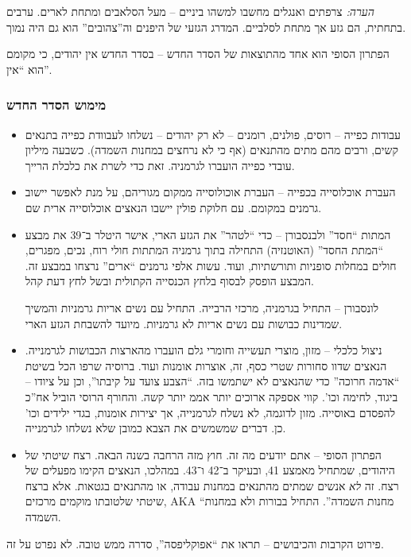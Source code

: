 \documentclass[]{article}
\theoremstyle{definition}
\begin{document}
    \textit{הערה: }צרפתים ואנגלים מחשבו למשהו ביניים – מעל הסלאבים ומתחת לארים. ערבים בתחתית, הם גזע אך מתחת לסלביים. המדרג הגזעי של היפנים וה''צהובים'' הוא גם היה נמוך. 
    
    הפתרון הסופי הוא אחד מהתוצאות של הסדר החדש – בסדר החדש אין יהודים, כי מקומם הוא ``אין''. 
    
    \subsubsection{מימוש הסדר החדש}
    \begin{itemize}
        \item עבודות כפייה – רוסים, פולנים, רומנים – לא רק יהודים – נשלחו לעבוודת כפייה בתנאים קשים, ורבים מהם מתים מהתנאים (אף כי לא נרחצים במחנות השמדה). כשבעה מיליון עובדי כפייה הועברו לגרמניה. זאת כדי לשרת את כלכלת הרייך. 
        \item העברת אוכלוסייה בכפייה – העברת אוכולוסייה ממקום מגוריהם, על מנת לאפשר יישוב גרמנים במקומם. עם חלוקת פולין יישבו הנאצים אוכלוסייה ארית שם. 
        \item המתות ``חסד'' ולבנסבורן – כדי ``לטהר'' את הגזע הארי, אישר היטלר ב־39 את מבצע ``המתת החסד'' (האוטנזיה) התחילה בתוך גרמניה המתתות חולי רוח, נכים, מפגרים, חולים במחלות סופניות ותורשתיות, ועוד. עשות אלפי גרמנים ``ארים'' נרצחו במבצע זה. המבצע הופסק לבסוף בלחץ הכנסייה הקתולית ובשל לחץ דעת קהל. 
        
        לונסבורן – התחיל בגרמניה, מרכזי הרבייה. התחיל עם נשים אריות גרמניות והמשיך שמדינות כבושות עם נשים אריות לא גרמניות. מיועד להשבחת הגזע הארי. 
        \item ניצול כלכלי – מזון, מוצרי תעשייה וחומרי גלם הועברו מהארצות הכבושות לגרמנייה. הנאצים שדוו סחורות שטרי כסף, זה, אוצרות אומנות ועוד. ברוסיה שרפו הכל בשיטת ``אדמה חרוכה'' כדי שהנאצים לא ישתמשו בזה. ``הצבע צועד על קיבתו'', וכן על ציודו – ביגוד, לחימה וכו'. קווי אספקה ארוכים יותר אממ יותר קשה. והחורף הרוסי הוביל אח''כ להפסדם באוסייה. מזון לדוגמה, לא נשלח לגרמנייה, אך יצירות אומנות, בגדי ילידים וכו' כן. דברים שמשמשים את הצבא כמובן שלא נשלחו לגרמנייה. 
        \item הפתרון הסופי – אתם יודעים מה זה. חוץ מזה הרחבה בשנה הבאה. רצח שיטתי של היהודים, שמתחיל מאמצע 41, ובעיקר ב־42 ו־43. במהלכו, הנאצים הקימו מפעלים של רצח. זה \textit{לא} אנשים שמתים מהתנאים במחנות עבודה, או מהתנאים בגטאות. אלא ברצח שיטתי שלטובתו מוקמים מרכזים, AKA ``מחנות השמדה''. התחיל בבורות ולא במחנות השמדה. 
    \end{itemize}
    
    פירוט הקרבות והכיבושים – תראו את ``אפוקליפסה'', סדרה ממש טובה. לא נפרט על זה. 
    
\end{document}
